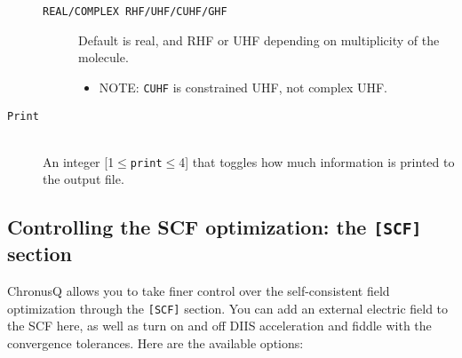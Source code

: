 \documentclass[12pt]{article}
\begin{document}
\begin{description}
\begin{description}
      \item[\texttt{REAL/COMPLEX RHF/UHF/CUHF/GHF}] Default is real, and RHF or UHF depending on multiplicity of the molecule.  
      \begin{itemize}
        \item NOTE: \texttt{CUHF} is constrained UHF, not complex UHF.
      \end{itemize}
      \end{description}
    \item[\texttt{Print}] \hfill \\
    An integer [1$\leq$\texttt{print}$\leq$4] that toggles how much information is printed to the output file.
    \end{description}
    \subsection{Controlling the SCF optimization: the \texttt{[SCF]} section} \label{subsec:SCFInput}
    ChronusQ allows you to take finer control over the self-consistent field optimization through the \texttt{[SCF]} section. You can add an external electric field to the SCF here, as well as turn on and off DIIS acceleration and fiddle with the convergence tolerances. Here are the available options:
\end{document}
